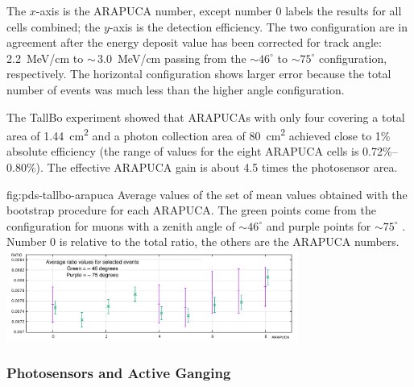 The $x$-axis is the ARAPUCA number, except number 0 labels the results for all cells combined; the $y$-axis is the detection efficiency. The two configuration are in agreement after the energy deposit value has been corrected for track angle: \SI{2.2}{MeV/cm} to $\sim\,$\SI{3.0}{MeV/cm} passing from the $\sim 46^{\circ}$ to $\sim 75^{\circ}$ configuration, respectively.
The horizontal configuration shows larger error because the total number of events was much less than the higher angle configuration.

The TallBo experiment showed that ARAPUCAs with only four  %
covering a total area of \SI{1.44}{cm^2} and a photon collection area of \SI{80}{cm^2} achieved close to 1\% absolute efficiency (the range of values for the eight ARAPUCA cells is 0.72\%--0.80\%). The effective ARAPUCA gain is about 4.5 times the photosensor area.

\begin{dunefigure}
 {fig:pds-tallbo-arapuca}
 {Average values of the set of mean values obtained with the bootstrap procedure for each ARAPUCA.
The green points come from the configuration for muons with a zenith angle of $\sim 46^{\circ}$ and purple points for $\sim 75^{\circ}$ . Number 0 is relative to the total ratio, the others are the ARAPUCA
numbers.}
\includegraphics[angle=0,height=3cm]{graphics/pds-arapuca_ratio.pdf}
\end{dunefigure}


\subsubsection{Photosensors and Active Ganging}
\label{sec:pds-valid-ganging}

